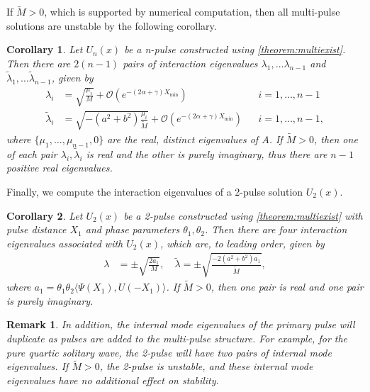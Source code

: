 \documentclass[12pt]{elsarticle}
\newtheorem{corollary}{Corollary}
\newtheorem{remark}{Remark}
\begin{document}
If $\tilde{M} > 0$, which is supported by numerical computation, then all multi-pulse solutions are unstable by the following corollary.

\begin{corollary}\label{corr:multiunstable}
Let $U_n(x)$ be a n-pulse constructed using \cref{theorem:multiexist}. Then there are $2(n-1)$ pairs of interaction eigenvalues $\lambda_1, \dots \lambda_{n-1}$ and $\tilde{\lambda}_1, \dots \tilde{\lambda}_{n-1}$, given by
\begin{equation}\label{inteigs}
\begin{aligned}
\lambda_i &= \sqrt{\frac{\mu_i}{M}} + \mathcal{O}\left( e^{-(2 \alpha + \gamma)X_{\min} } \right) && i = 1, \dots, n-1 \\
\tilde{\lambda}_i &= \sqrt{-(a^2 + b^2) \frac{\mu_i}{\tilde{M}}} + \mathcal{O}\left( e^{-(2 \alpha + \gamma)X_{\min} } \right) && i = 1, \dots, n-1,
\end{aligned}
\end{equation}
where $\{ \mu_1,\dots,\mu_{n-1}, 0\}$ are the real, distinct eigenvalues of $A$. If $\tilde{M} > 0$, then one of each pair $\lambda_i, \tilde{\lambda}_i$ is real and the other is purely imaginary, thus there are $n-1$ positive real eigenvalues.
\end{corollary}

Finally, we compute the interaction eigenvalues of a 2-pulse solution $U_2(x)$.

\begin{corollary}\label{corr:2pstab}
Let $U_2(x)$ be a 2-pulse constructed using \cref{theorem:multiexist} with pulse distance $X_1$ and phase parameters $\theta_1, \theta_2$. Then there are four interaction eigenvalues associated with $U_2(x)$, which are, to leading order, given by
\begin{equation}\label{inteigpred}
\begin{aligned}
\lambda &= \pm \sqrt{ \frac{2 a_1}{M} }, \quad
\tilde{\lambda} = \pm \sqrt{ \frac{-2 (a^2 + b^2) a_1}{\tilde{M}} },
\end{aligned}
\end{equation}
where $a_1 = \theta_1 \theta_2 \langle \Psi(X_1), U(-X_1) \rangle$. If $\tilde{M} > 0$, then one pair is real and one pair is purely imaginary.
\end{corollary}

\begin{remark}In addition, the internal mode eigenvalues of the primary pulse will duplicate as pulses are added to the multi-pulse structure. For example, for the pure quartic solitary wave, the 2-pulse will have two pairs of internal mode eigenvalues. If $\tilde{M} > 0$, the 2-pulse is unstable, and these internal mode eigenvalues have no additional effect on stability.
\end{remark}
\end{document}
